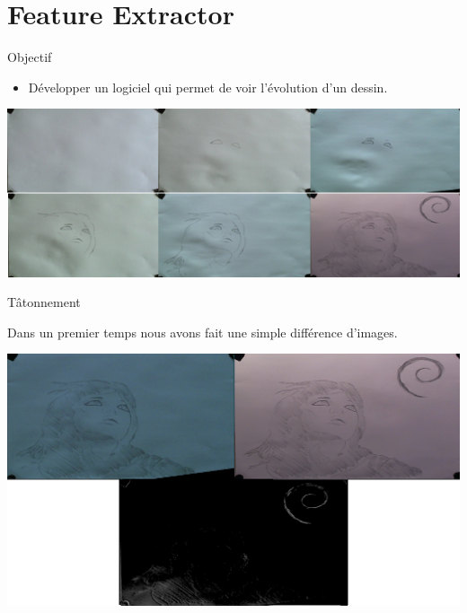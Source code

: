 \documentclass[t,14pt]{beamer}
\begin{document}
\section[Extraction de nouveautés]{Feature Extractor}
\begin{frame}{Objectif}
\vspace{5mm}
\begin{block}{}
\begin{itemize}
\item Développer un logiciel qui permet de voir l'évolution d'un dessin.
\end{itemize}
\end{block}
\begin{center}
\includegraphics[width=\textwidth]{images/evo/evo.png}
\end{center}
\end{frame}

\begin{frame}{Tâtonnement}
\vspace{5mm}
\begin{block}{}
Dans un premier temps nous avons fait une simple différence d'images.
\end{block}
\begin{center}
\includegraphics[width=\textwidth]{images/evo/diff.png}
\end{center} 
\end{frame}
\end{document}
